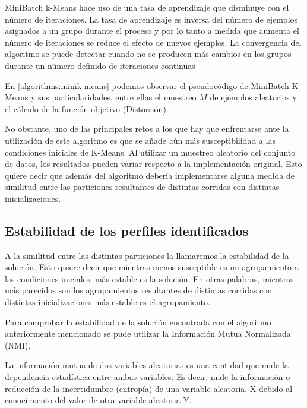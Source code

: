MiniBatch k-Means hace uso de una tasa de aprendizaje que disminuye con el número de iteraciones. La tasa de aprendizaje es inversa del número de ejemplos asignados a un grupo durante el proceso y por lo tanto a medida que aumenta el número de iteraciones se reduce el efecto de nuevos ejemplos. La convergencia del algoritmo se puede detectar cuando no se producen más cambios en los grupos durante un número definido de iteraciones continuas


En \ref{algorithms:minik-means} podemos observar el pseudocódigo de MiniBatch K-Means y sus particularidades, entre ellas el muestreo $M$ de ejemplos aleatorios y el cálculo de la función objetivo (Distorsión).

 

No obstante, uno de las principales retos a los que hay que enfrentarse ante la utilización de este algoritmo es que se añade aún más susceptibilidad a las condiciones iniciales de K-Means. Al utilizar un muestreo aleatorio del conjunto de datos, los resultados pueden variar respecto a la implementación original. Esto quiere decir que además del algoritmo debería implementarse alguna medida de similitud entre las particiones resultantes de distintas corridas con distintas inicializaciones. 

\subsection{Estabilidad de los perfiles identificados}

A la similitud entre las distintas particiones la llamaremos la estabilidad de la solución. Esto quiere decir que mientras menos susceptible es un agrupamiento a las condiciones iniciales, más estable es la solución. En otras palabras, mientras más parecidos son los agrupamientos resultantes de distintas corridas con distintas inicializaciones más estable es el agrupamiento.

Para comprobar la estabilidad de la solución encontrada con el algoritmo anteriormente mencionado se pude utilizar la Información Mutua Normalizada (NMI).

La información mutua de dos variables aleatorias es una cantidad que mide la dependencia estadística entre ambas variables. Es decir, mide la información o reducción de la incertidumbre (entropía) de una variable aleatoria, X debido al conocimiento del valor de otra variable aleatoria Y.

